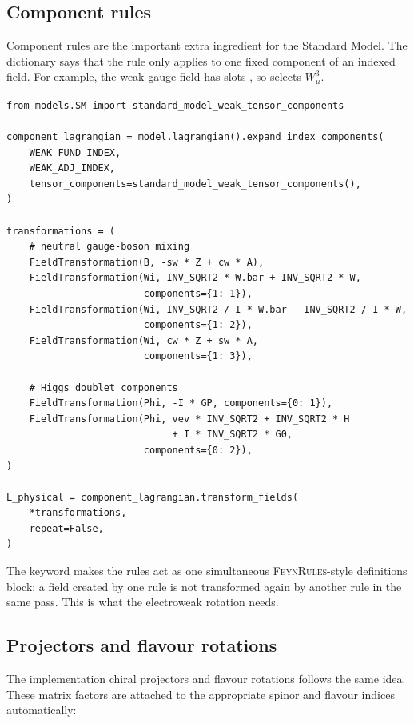 \subsection*{Component rules}

Component rules are the important extra ingredient for the Standard Model.
The dictionary  says that the rule only applies
to one fixed component of an indexed field. For example, the weak gauge field
has slots , so  selects
$W^3_\mu$.

\begin{verbatim}
from models.SM import standard_model_weak_tensor_components

component_lagrangian = model.lagrangian().expand_index_components(
    WEAK_FUND_INDEX,
    WEAK_ADJ_INDEX,
    tensor_components=standard_model_weak_tensor_components(),
)

transformations = (
    # neutral gauge-boson mixing
    FieldTransformation(B, -sw * Z + cw * A),
    FieldTransformation(Wi, INV_SQRT2 * W.bar + INV_SQRT2 * W,
                        components={1: 1}),
    FieldTransformation(Wi, INV_SQRT2 / I * W.bar - INV_SQRT2 / I * W,
                        components={1: 2}),
    FieldTransformation(Wi, cw * Z + sw * A,
                        components={1: 3}),

    # Higgs doublet components
    FieldTransformation(Phi, -I * GP, components={0: 1}),
    FieldTransformation(Phi, vev * INV_SQRT2 + INV_SQRT2 * H
                             + I * INV_SQRT2 * G0,
                        components={0: 2}),
)

L_physical = component_lagrangian.transform_fields(
    *transformations,
    repeat=False,
)
\end{verbatim}

\noindent The keyword  makes the rules act as one
simultaneous \textsc{FeynRules}-style definitions block: a field created by
one rule is not transformed again by another rule in the same pass. This is
what the electroweak rotation needs.

\subsection*{Projectors and flavour rotations}

The implementation chiral projectors and flavour rotations follows the same idea. These matrix factors are attached to the appropriate spinor and flavour indices automatically:

